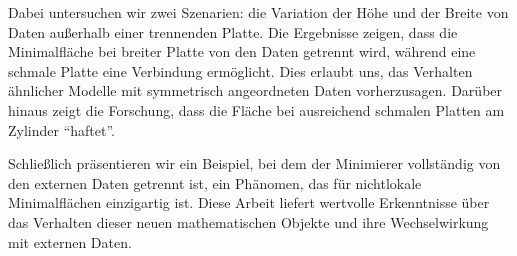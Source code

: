 Dabei untersuchen wir zwei Szenarien: die Variation der Höhe und der Breite von Daten
außerhalb einer trennenden Platte. Die Ergebnisse zeigen, dass die Minimalfläche bei
breiter Platte von den Daten getrennt wird, während eine schmale Platte eine Verbindung
ermöglicht. Dies erlaubt uns, das Verhalten ähnlicher Modelle mit symmetrisch angeordneten
Daten vorherzusagen. Darüber hinaus zeigt die Forschung, dass die Fläche bei ausreichend
schmalen Platten am Zylinder \enquote{haftet}.\newline

Schließlich präsentieren wir ein Beispiel, bei dem der Minimierer vollständig von den
externen Daten getrennt ist, ein Phänomen, das für nichtlokale Minimalflächen einzigartig
ist. Diese Arbeit liefert wertvolle Erkenntnisse über das Verhalten dieser neuen
mathematischen Objekte und ihre Wechselwirkung mit externen Daten.

